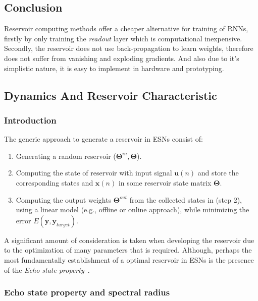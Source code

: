 \documentclass{WitsPhysicsReport}
\begin{document}
\subsection{Conclusion}
Reservoir computing methods offer a cheaper alternative for training of RNNs, firstly by only training the \textit{readout} layer which is computational inexpensive. Secondly, the reservoir does not use back-propagation to learn weights, therefore does not suffer from vanishing and exploding gradients. And also due to it's simplistic nature, it is easy to implement in hardware and prototyping.

\newpage 
\subsection{Dynamics And Reservoir Characteristic}
\label{sec:Dynamics_and_reservoir_characteristic}
\subsubsection{Introduction}
The generic approach to generate a reservoir in ESNs consist of:


\begin{enumerate}
  \item Generating a random reservoir ($\mathbf{{\Theta}}^{in},\mathbf{\Theta}$).
  \item Computing the state of reservoir with input signal $\mathbf{u}(n)$ and store the corresponding states and  $\mathbf{x}(n)$ in some reservoir state matrix $\mathbf{\Theta}$.
  \item Computing the output weights $\mathbf{{\Theta}}^{out}$ from the collected states in (step 2), using a linear model (e.g., offline or online approach), while minimizing the error $E(\mathbf{y},\mathbf{y}_{target})$.
\label{item: reservoir_generation}
\end{enumerate}


A significant amount of consideration is taken when developing the reservoir due to the optimization of many parameters that is required. Although, perhaps the most fundamentally establishment of a optimal reservoir in ESNs is the presence of the \textit{Echo state property}~\cite{jaeger2001echo}.


\subsubsection{Echo state property and spectral radius}
\label{sec:echo_state_property_and_spectral_radius}
\end{document}
